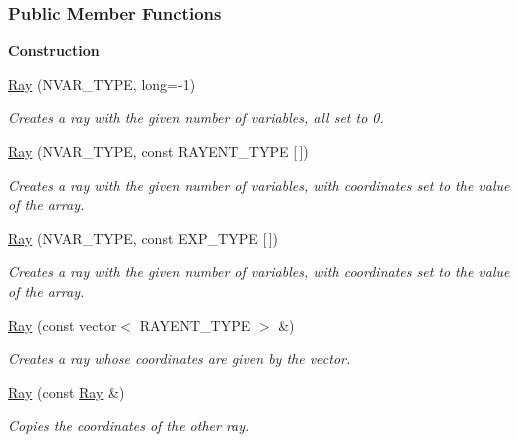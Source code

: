 \subsubsection*{Public Member Functions}
\begin{Indent}\textbf{ Construction}\par
\begin{DoxyCompactItemize}
\item 
\hyperlink{group___c_l_s_solvers_ae6acfc48cec4f68f5855aae467f71095}{Ray} (N\+V\+A\+R\+\_\+\+T\+Y\+PE, long=-\/1)
\begin{DoxyCompactList}\small\item\em Creates a ray with the given number of variables, all set to 0. \end{DoxyCompactList}\item 
\hyperlink{group___c_l_s_solvers_ad69015f04db3f988b47cd05bae4f41a8}{Ray} (N\+V\+A\+R\+\_\+\+T\+Y\+PE, const R\+A\+Y\+E\+N\+T\+\_\+\+T\+Y\+PE \mbox{[}$\,$\mbox{]})
\begin{DoxyCompactList}\small\item\em Creates a ray with the given number of variables, with coordinates set to the value of the array. \end{DoxyCompactList}\item 
\hyperlink{group___c_l_s_solvers_aecc046b9f6a47f40ffddfc3334a47079}{Ray} (N\+V\+A\+R\+\_\+\+T\+Y\+PE, const E\+X\+P\+\_\+\+T\+Y\+PE \mbox{[}$\,$\mbox{]})
\begin{DoxyCompactList}\small\item\em Creates a ray with the given number of variables, with coordinates set to the value of the array. \end{DoxyCompactList}\item 
\hyperlink{group___c_l_s_solvers_adb1e6f09dbb5081c8f34d245b1880ccc}{Ray} (const vector$<$ R\+A\+Y\+E\+N\+T\+\_\+\+T\+Y\+PE $>$ \&)
\begin{DoxyCompactList}\small\item\em Creates a ray whose coordinates are given by the vector. \end{DoxyCompactList}\item 
\hyperlink{group___c_l_s_solvers_a3a98b2f969408ba0fa58b46a3dccb9bf}{Ray} (const \hyperlink{group___c_l_s_solvers_class_l_p___solvers_1_1_ray}{Ray} \&)
\begin{DoxyCompactList}\small\item\em Copies the coordinates of the other ray. \end{DoxyCompactList}\end{DoxyCompactItemize}
\end{Indent}

